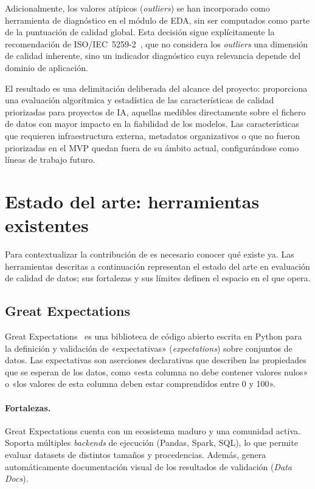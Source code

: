 Adicionalmente, los valores atípicos (\emph{outliers}) se han incorporado como
herramienta de diagnóstico en el módulo de \ac{EDA}, sin ser computados como
parte de la puntuación de calidad global. Esta decisión sigue explícitamente
la recomendación de \ac{ISO}/IEC~5259-2~\citep{iso5259}, que no considera los
\emph{outliers} una dimensión de calidad inherente, sino un indicador diagnóstico cuya
relevancia depende del dominio de aplicación.

El resultado es una delimitación deliberada del alcance del proyecto:
\dataqual proporciona una evaluación algorítmica y estadística de las
características de calidad priorizadas para proyectos de \ac{IA},
aquellas medibles directamente sobre el fichero de datos con mayor impacto
en la fiabilidad de los modelos. Las características que requieren
infraestructura externa, metadatos organizativos o que no fueron priorizadas
en el \ac{MVP} quedan fuera de su ámbito actual, configurándose como líneas
de trabajo futuro.


\section{Estado del arte: herramientas existentes}
\label{sec:estado-arte}

Para contextualizar la contribución de \dataqual es necesario conocer qué
existe ya. Las herramientas descritas a continuación representan el estado
del arte en evaluación de calidad de datos; sus fortalezas y sus límites
definen el espacio en el que \dataqual opera.

\subsection{Great Expectations}
\label{sec:great-expectations}

Great Expectations~\citep{greatexpectations} es una biblioteca de código abierto
escrita en Python para la definición y validación de «expectativas»
(\emph{expectations}) sobre conjuntos de datos. Las expectativas son
aserciones declarativas que describen las propiedades que se esperan de los
datos, como «esta columna no debe contener valores nulos» o «los valores de
esta columna deben estar comprendidos entre 0 y 100».

\paragraph{Fortalezas.}
Great Expectations cuenta con un ecosistema maduro y una comunidad activa.
Soporta múltiples \emph{backends} de ejecución (Pandas, Spark, \ac{SQL}),
lo que permite evaluar datasets de distintos tamaños y procedencias. Además,
genera automáticamente documentación visual de los resultados de validación
(\emph{Data Docs}).

